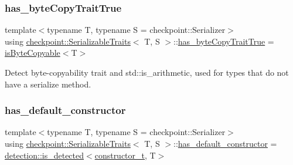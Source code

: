 \subsubsection{\texorpdfstring{has\+\_\+byte\+Copy\+Trait\+True}{has\_byteCopyTraitTrue}}
{\footnotesize\ttfamily template$<$typename T, typename S = checkpoint\+::\+Serializer$>$ \\
using \hyperlink{structcheckpoint_1_1_serializable_traits}{checkpoint\+::\+Serializable\+Traits}$<$ T, S $>$\+::\hyperlink{structcheckpoint_1_1_serializable_traits_a8e42305be1264b105f525ae7dff36c15}{has\+\_\+byte\+Copy\+Trait\+True} =  \hyperlink{structcheckpoint_1_1is_byte_copyable}{is\+Byte\+Copyable}$<$T$>$}

Detect byte-\/copyability trait and std\+::is\+\_\+arithmetic, used for types that do not have a serialize method. \mbox{\label{structcheckpoint_1_1_serializable_traits_a824afd2953233388cbc3223a82c75df8}} 
\subsubsection{\texorpdfstring{has\+\_\+default\+\_\+constructor}{has\_default\_constructor}}
{\footnotesize\ttfamily template$<$typename T, typename S = checkpoint\+::\+Serializer$>$ \\
using \hyperlink{structcheckpoint_1_1_serializable_traits}{checkpoint\+::\+Serializable\+Traits}$<$ T, S $>$\+::\hyperlink{structcheckpoint_1_1_serializable_traits_a824afd2953233388cbc3223a82c75df8}{has\+\_\+default\+\_\+constructor} =  \hyperlink{namespacedetection_a30893549a3de1e9603d78dad6d5dce92}{detection\+::is\+\_\+detected}$<$\hyperlink{structcheckpoint_1_1_serializable_traits_aa0430155930461d346b90681db234d84}{constructor\+\_\+t}, T$>$}

\mbox{\label{structcheckpoint_1_1_serializable_traits_a8a8b20be974e219f4fb39b4346be0536}} 
